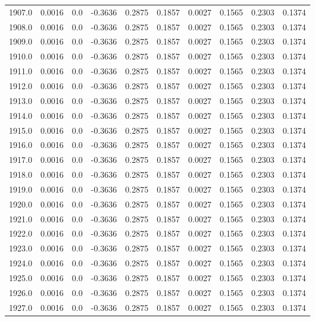 \begin{longtable}{lrrrrrrrrr}
1907.0 & 0.0016 & 0.0 & -0.3636 & 0.2875 & 0.1857 & 0.0027 & 0.1565 & 0.2303 & 0.1374 \\
1908.0 & 0.0016 & 0.0 & -0.3636 & 0.2875 & 0.1857 & 0.0027 & 0.1565 & 0.2303 & 0.1374 \\
1909.0 & 0.0016 & 0.0 & -0.3636 & 0.2875 & 0.1857 & 0.0027 & 0.1565 & 0.2303 & 0.1374 \\
1910.0 & 0.0016 & 0.0 & -0.3636 & 0.2875 & 0.1857 & 0.0027 & 0.1565 & 0.2303 & 0.1374 \\
1911.0 & 0.0016 & 0.0 & -0.3636 & 0.2875 & 0.1857 & 0.0027 & 0.1565 & 0.2303 & 0.1374 \\
1912.0 & 0.0016 & 0.0 & -0.3636 & 0.2875 & 0.1857 & 0.0027 & 0.1565 & 0.2303 & 0.1374 \\
1913.0 & 0.0016 & 0.0 & -0.3636 & 0.2875 & 0.1857 & 0.0027 & 0.1565 & 0.2303 & 0.1374 \\
1914.0 & 0.0016 & 0.0 & -0.3636 & 0.2875 & 0.1857 & 0.0027 & 0.1565 & 0.2303 & 0.1374 \\
1915.0 & 0.0016 & 0.0 & -0.3636 & 0.2875 & 0.1857 & 0.0027 & 0.1565 & 0.2303 & 0.1374 \\
1916.0 & 0.0016 & 0.0 & -0.3636 & 0.2875 & 0.1857 & 0.0027 & 0.1565 & 0.2303 & 0.1374 \\
1917.0 & 0.0016 & 0.0 & -0.3636 & 0.2875 & 0.1857 & 0.0027 & 0.1565 & 0.2303 & 0.1374 \\
1918.0 & 0.0016 & 0.0 & -0.3636 & 0.2875 & 0.1857 & 0.0027 & 0.1565 & 0.2303 & 0.1374 \\
1919.0 & 0.0016 & 0.0 & -0.3636 & 0.2875 & 0.1857 & 0.0027 & 0.1565 & 0.2303 & 0.1374 \\
1920.0 & 0.0016 & 0.0 & -0.3636 & 0.2875 & 0.1857 & 0.0027 & 0.1565 & 0.2303 & 0.1374 \\
1921.0 & 0.0016 & 0.0 & -0.3636 & 0.2875 & 0.1857 & 0.0027 & 0.1565 & 0.2303 & 0.1374 \\
1922.0 & 0.0016 & 0.0 & -0.3636 & 0.2875 & 0.1857 & 0.0027 & 0.1565 & 0.2303 & 0.1374 \\
1923.0 & 0.0016 & 0.0 & -0.3636 & 0.2875 & 0.1857 & 0.0027 & 0.1565 & 0.2303 & 0.1374 \\
1924.0 & 0.0016 & 0.0 & -0.3636 & 0.2875 & 0.1857 & 0.0027 & 0.1565 & 0.2303 & 0.1374 \\
1925.0 & 0.0016 & 0.0 & -0.3636 & 0.2875 & 0.1857 & 0.0027 & 0.1565 & 0.2303 & 0.1374 \\
1926.0 & 0.0016 & 0.0 & -0.3636 & 0.2875 & 0.1857 & 0.0027 & 0.1565 & 0.2303 & 0.1374 \\
1927.0 & 0.0016 & 0.0 & -0.3636 & 0.2875 & 0.1857 & 0.0027 & 0.1565 & 0.2303 & 0.1374 \\

\end{longtable}
